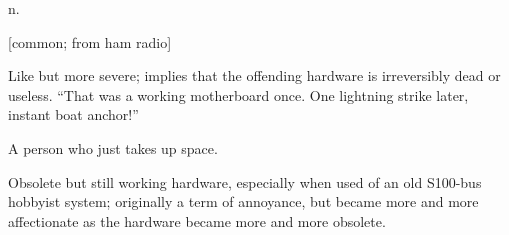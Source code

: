  n.

[common; from ham radio]
\begin{inparaenum}
\item Like  but more severe; implies that the offending
    hardware is irreversibly dead or useless. ``That was a working motherboard
    once. One lightning strike later, instant boat anchor!''
\item A person who just takes up space.
\item Obsolete but still working hardware, especially when used of an old
    S100-bus hobbyist system; originally a term of annoyance, but became more
    and more affectionate as the hardware became more and more obsolete.
\end{inparaenum}

